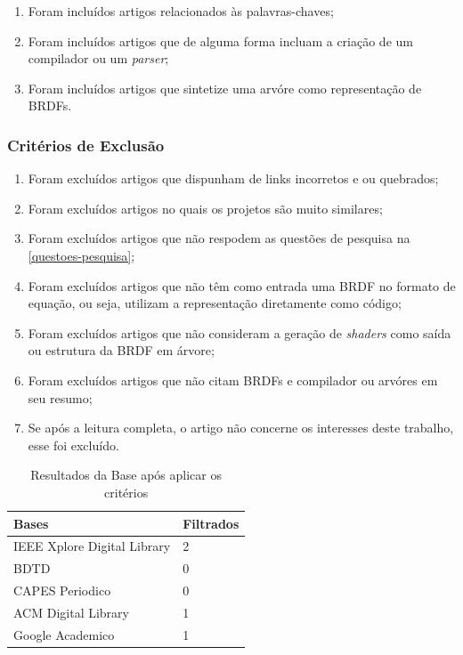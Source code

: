 \documentclass[english, 
               brazil, 
               bsc] %
               {dcomp-abntex2}
\begin{document}
\begin{enumerate}
  \item Foram incluídos artigos relacionados às palavras-chaves;
  \item Foram incluídos artigos que de alguma forma incluam a criação de um compilador ou um \textit{parser};
  \item Foram incluídos artigos que sintetize uma arvóre como representação de BRDFs.
\end{enumerate}

\subsubsection{Critérios de Exclusão}

\begin{enumerate}
  \item Foram excluídos artigos que dispunham de links incorretos e ou quebrados;
  \item Foram excluídos artigos no quais os projetos são muito similares;
  \item Foram excluídos artigos que não respodem as questões de pesquisa na \autoref{questoes-pesquisa};
  \item Foram excluídos artigos que não têm como entrada uma BRDF no formato de equação, ou seja, utilizam a representação diretamente como código;
  \item Foram excluídos artigos que não consideram a geração de \textit{shaders} como saída ou estrutura da BRDF em árvore;
  \item Foram excluídos artigos que não citam BRDFs e compilador ou arvóres em seu resumo;
  \item Se após a leitura completa, o artigo não concerne os interesses deste trabalho, esse foi excluído.
\end{enumerate}


\begin{table}[H]
\ABNTEXfontereduzida
  \caption[bases]{Resultados da Base após aplicar os critérios}
\label{tab-result}
\begin{tabular}{p{6.6cm}|p{6.6cm}}
   \textbf{Bases}  & \textbf{Filtrados}\\
   \hline
    IEEE Xplore Digital Library
   & 2
    \\ \hline
    BDTD
    & 0
    \\ \hline
    CAPES Periodico
    & 0
    \\ \hline

  ACM Digital Library
  & 1
    \\ \hline
 Google Academico 
  & 1
\end{tabular}
\end{table}
\end{document}
